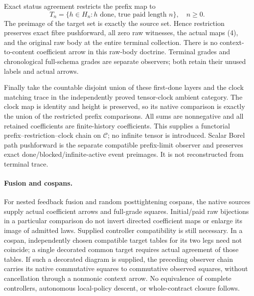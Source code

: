 \documentclass[11pt]{article}
\begin{document}
Exact status agreement restricts the prefix map to
\[
 T_n=\{h\in H_n:h\text{ done, true paid length }n\},\quad n\geq0. \tag{5}
\]
The preimage of the target set is exactly the source set. Hence restriction preserves exact fibre pushforward, all zero raw witnesses, the actual maps (4), and the original raw body at the entire terminal collection. There is no context-to-content coefficient arrow in this raw-body doctrine. Terminal grades and chronological full-schema grades are separate observers; both retain their unused labels and actual arrows.

Finally take the countable disjoint union of these first-done layers and the clock matching trace in the independently proved tensor-clock ambient category. The clock map is identity and height is preserved, so its native comparison is exactly the union of the restricted prefix comparisons. All sums are nonnegative and all retained coefficients are finite-history coefficients. This supplies a functorial prefix--restriction--clock chain on $\mathcal C$; no infinite tensor is introduced. Scalar Borel path pushforward is the separate compatible prefix-limit observer and preserves exact done/blocked/infinite-active event preimages. It is not reconstructed from terminal trace.

\paragraph{Fusion and cospans.}
For nested feedback fusion and random posttightening cospans, the native sources supply actual coefficient arrows and full-grade squares. Initial/paid raw bijections in a particular comparison do not invert directed coefficient maps or enlarge its image of admitted laws. Supplied controller compatibility is still necessary. In a cospan, independently chosen compatible target tables for its two legs need not coincide; a single decorated common target requires actual agreement of those tables. If such a decorated diagram is supplied, the preceding observer chain carries its native commutative squares to commutative observed squares, without cancellation through a nonmonic context arrow. No equivalence of complete controllers, autonomous local-policy descent, or whole-contract closure follows.
\end{document}
